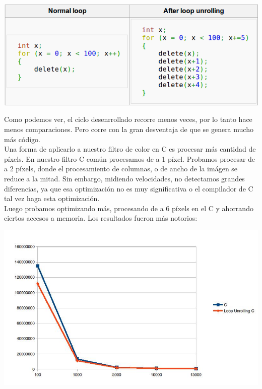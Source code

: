 \begin{center}
\includegraphics[scale=0.5]{imagenes/loopunrolling_ejemplo.png}
\end{center}

Como podemos ver, el ciclo desenrrollado recorre menos veces, por lo tanto hace menos comparaciones. Pero corre con la gran desventaja de que se genera mucho m\'as c\'odigo.\\
Una forma de aplicarlo a nuestro filtro de color en C es procesar m\'as cantidad de p\'ixels. En nuestro filtro C com\'un procesamos de a 1 p\'ixel. Probamos procesar de a 2 p\'ixels, donde el procesamiento de columnas, o de ancho de la im\'agen se reduce a la mitad. Sin embargo, midiendo velocidades, no detectamos grandes diferencias, ya que esa optimizaci\'on no es muy significativa o el compilador de C tal vez haga esta optimizaci\'on.\\
Luego probamos optimizando m\'as, procesando de a 6 p\'ixels en el C y ahorrando ciertos accesos a memoria. Los resultados fueron m\'as notorios:

\begin{center}
\includegraphics[scale=0.5]{imagenes/loopunrolling_c.jpg}
\end{center}

